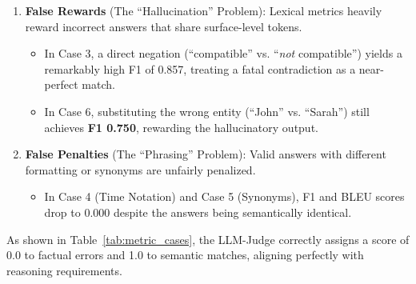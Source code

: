 \documentclass[11pt]{article}
\begin{document}
\begin{enumerate}
    \item \textbf{False Rewards} (The ``Hallucination'' Problem): Lexical metrics heavily reward incorrect answers that share surface-level tokens. 
    \begin{itemize}
        \item In Case 3, a direct negation (``compatible'' vs. ``\textit{not} compatible'') yields a remarkably high F1 of 0.857, treating a fatal contradiction as a near-perfect match.
        \item In Case 6, substituting the wrong entity (``John'' vs. ``Sarah'') still achieves \textbf{F1 0.750}, rewarding the hallucinatory output.
    \end{itemize}

    \item \textbf{False Penalties} (The ``Phrasing'' Problem): Valid answers with different formatting or synonyms are unfairly penalized.
    \begin{itemize}
        \item In Case 4 (Time Notation) and Case 5 (Synonyms), F1 and BLEU scores drop to 0.000 despite the answers being semantically identical.
    \end{itemize}
\end{enumerate}

As shown in Table~\ref{tab:metric_cases}, the LLM-Judge correctly assigns a score of 0.0 to factual errors and 1.0 to semantic matches, aligning perfectly with reasoning requirements.
\end{document}
